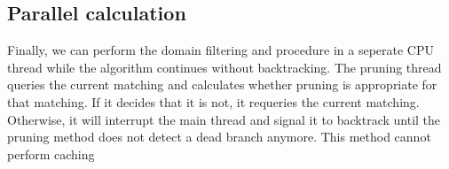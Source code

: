\subsection{Parallel calculation}
Finally, we can perform the domain filtering and procedure in a seperate CPU thread while the algorithm continues without backtracking. The pruning thread queries the current matching and calculates whether pruning is appropriate for that matching. If it decides that it is not, it requeries the current matching. Otherwise, it will interrupt the main thread and signal it to backtrack until the pruning method does not detect a dead branch anymore. This method cannot perform caching
